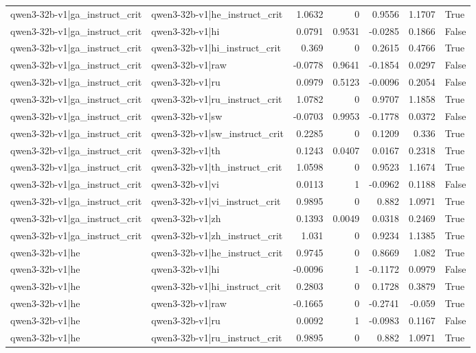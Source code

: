 \begin{table}
\begin{tabular}{l l r r r r l}
qwen3-32b-v1|ga_instruct_crit & qwen3-32b-v1|he_instruct_crit & 1.0632 & 0 & 0.9556 & 1.1707 & True \\
qwen3-32b-v1|ga_instruct_crit & qwen3-32b-v1|hi & 0.0791 & 0.9531 & -0.0285 & 0.1866 & False \\
qwen3-32b-v1|ga_instruct_crit & qwen3-32b-v1|hi_instruct_crit & 0.369 & 0 & 0.2615 & 0.4766 & True \\
qwen3-32b-v1|ga_instruct_crit & qwen3-32b-v1|raw & -0.0778 & 0.9641 & -0.1854 & 0.0297 & False \\
qwen3-32b-v1|ga_instruct_crit & qwen3-32b-v1|ru & 0.0979 & 0.5123 & -0.0096 & 0.2054 & False \\
qwen3-32b-v1|ga_instruct_crit & qwen3-32b-v1|ru_instruct_crit & 1.0782 & 0 & 0.9707 & 1.1858 & True \\
qwen3-32b-v1|ga_instruct_crit & qwen3-32b-v1|sw & -0.0703 & 0.9953 & -0.1778 & 0.0372 & False \\
qwen3-32b-v1|ga_instruct_crit & qwen3-32b-v1|sw_instruct_crit & 0.2285 & 0 & 0.1209 & 0.336 & True \\
qwen3-32b-v1|ga_instruct_crit & qwen3-32b-v1|th & 0.1243 & 0.0407 & 0.0167 & 0.2318 & True \\
qwen3-32b-v1|ga_instruct_crit & qwen3-32b-v1|th_instruct_crit & 1.0598 & 0 & 0.9523 & 1.1674 & True \\
qwen3-32b-v1|ga_instruct_crit & qwen3-32b-v1|vi & 0.0113 & 1 & -0.0962 & 0.1188 & False \\
qwen3-32b-v1|ga_instruct_crit & qwen3-32b-v1|vi_instruct_crit & 0.9895 & 0 & 0.882 & 1.0971 & True \\
qwen3-32b-v1|ga_instruct_crit & qwen3-32b-v1|zh & 0.1393 & 0.0049 & 0.0318 & 0.2469 & True \\
qwen3-32b-v1|ga_instruct_crit & qwen3-32b-v1|zh_instruct_crit & 1.031 & 0 & 0.9234 & 1.1385 & True \\
qwen3-32b-v1|he & qwen3-32b-v1|he_instruct_crit & 0.9745 & 0 & 0.8669 & 1.082 & True \\
qwen3-32b-v1|he & qwen3-32b-v1|hi & -0.0096 & 1 & -0.1172 & 0.0979 & False \\
qwen3-32b-v1|he & qwen3-32b-v1|hi_instruct_crit & 0.2803 & 0 & 0.1728 & 0.3879 & True \\
qwen3-32b-v1|he & qwen3-32b-v1|raw & -0.1665 & 0 & -0.2741 & -0.059 & True \\
qwen3-32b-v1|he & qwen3-32b-v1|ru & 0.0092 & 1 & -0.0983 & 0.1167 & False \\
qwen3-32b-v1|he & qwen3-32b-v1|ru_instruct_crit & 0.9895 & 0 & 0.882 & 1.0971 & True \\

\end{tabular}
\end{table}
